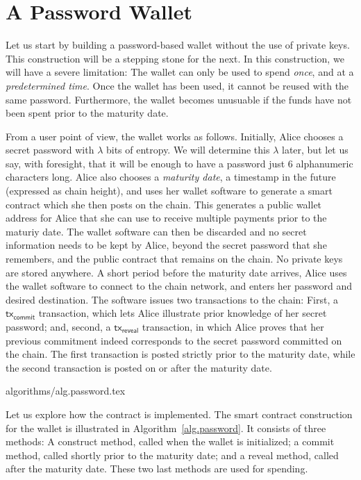 \section{A Password Wallet}\label{sec:password}

Let us start by building a password-based wallet without the use of private keys.
This construction will be a stepping stone for the next. In this construction, we
will have a severe limitation: The wallet can only be used to spend \emph{once},
and at a \emph{predetermined time}. Once the wallet has been used, it cannot be
reused with the same password. Furthermore, the wallet becomes unusuable if the
funds have not been spent prior to the maturity date.

From a user point of view, the wallet works as follows. Initially, Alice chooses
a secret password with $\lambda$ bits of entropy. We will determine this $\lambda$
later, but let us say, with foresight, that it will be enough to have a password
just $6$ alphanumeric characters long. Alice also chooses a \emph{maturity date},
a timestamp in the future (expressed as chain height),
and uses her wallet software to generate
a smart contract which she then posts on the chain. This generates a public wallet
address for Alice that she can use to receive multiple payments prior to the maturiy date.
The wallet software can then
be discarded and no secret information needs to be kept by Alice, beyond the
secret password that she remembers, and the public contract that remains on the chain.
No private keys are stored anywhere.
A short period before the maturity date arrives,
Alice uses the wallet software to connect to the chain network, and enters her
password and desired destination. The software issues two transactions to the chain:
First, a $\textsf{tx}_\textsf{commit}$ transaction, which lets Alice illustrate prior
knowledge of her secret password; and, second, a $\textsf{tx}_\textsf{reveal}$ transaction,
in which Alice proves that her previous commitment indeed corresponds to the secret
password committed on the chain. The first transaction is posted strictly prior to the maturity
date, while the second transaction is posted on or after the maturity date.

{algorithms/alg.password.tex}

Let us explore how the contract is implemented.
The smart contract construction for the wallet is illustrated in
Algorithm~\ref{alg.password}. It consists of three methods: A \textsf{construct}
method, called when the wallet is initialized; a \textsf{commit} method, called
shortly prior to the maturity date; and a \textsf{reveal} method, called after
the maturity date. These two last methods are used for spending.

